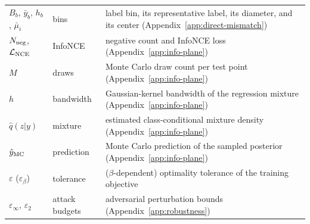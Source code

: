 \begin{center}
\begin{longtable}{l l p{7.5cm}}
$B_b$, $\bar y_b$, $h_b$, $\bar\mu_i$ & bins & label bin, its representative label, its diameter, and its center (Appendix~\ref{app:direct-mismatch}) \\
$N_{\rm neg}$, $\mathcal L_{\rm NCE}$ & InfoNCE & negative count and InfoNCE loss (Appendix~\ref{app:info-plane}) \\
$M$ & draws & Monte Carlo draw count per test point (Appendix~\ref{app:info-plane}) \\
$h$ & bandwidth & Gaussian-kernel bandwidth of the regression mixture (Appendix~\ref{app:info-plane}) \\
$\hat q(z|y)$ & mixture & estimated class-conditional mixture density (Appendix~\ref{app:info-plane}) \\
$\hat y_{\rm MC}$ & prediction & Monte Carlo prediction of the sampled posterior (Appendix~\ref{app:info-plane}) \\
$\varepsilon$ ($\varepsilon_\beta$) & tolerance & ($\beta$-dependent) optimality tolerance of the training objective \\
$\varepsilon_\infty$, $\varepsilon_2$ & attack budgets & adversarial perturbation bounds (Appendix~\ref{app:robustness}) \\
\hline
\end{longtable}
\end{center}
